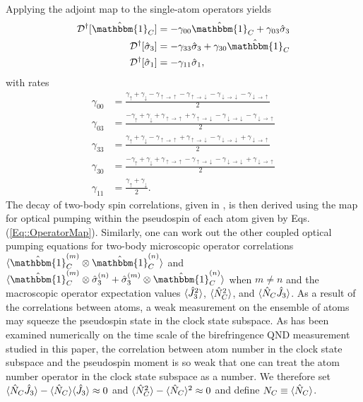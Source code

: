 \documentclass[aps,pra,twocolumn]{revtex4-1} %
\newcommand{\gammauu}{\gamma_{\uparrow \rightarrow \uparrow}}
\newcommand{\gammadd}{\gamma_{\downarrow \rightarrow \downarrow}}
\newcommand{\gammaud}{\gamma_{\uparrow \rightarrow \downarrow}}
\newcommand{\gammadu}{\gamma_{\downarrow \rightarrow \uparrow}}
\newcommand{\comment}[1]{{\color{Maroon} #1}}
\begin{document}
\begin{appendix}
Applying the adjoint map to the single-atom operators yields 
	\begin{subequations} \label{Eq::OperatorMap}
	\begin{align}
		\mathcal{D}\dg[\hat{\mathbbm{1}}_C] & = - \gamma_{00} \hat{\mathbbm{1}}_C +\gamma_{03} \hat{\sigma}_3 \label {Eq::Idecay} \\
		\mathcal{D}\dg[\hat{\sigma}_3] & =- \gamma_{33} \hat{\sigma}_3 +  \gamma_{30} \hat{\mathbbm{1}}_C 
\label{Eq::zdecay} \\
		\mathcal{D}\dg[\hat{\sigma}_1] & = - \gamma_{11} \hat{\sigma}_1\label{Eq::xdecay},
	\end{align}
	\end{subequations}
with rates	
	\begin{subequations} \label{Eq::DecayRates}
	\begin{align}
		\gamma_{00} 
			& = \frac{\gamma_{\uparrow}+\gamma_{\downarrow} - \gammauu-\gammaud  -\gammadd-\gammadu}{2} \label{Eq::lrate} \\
			\gamma_{03} 
			& = \frac{-\gamma_{\uparrow}+\gamma_{\downarrow} +\gammauu + \gammaud - \gammadd - \gammadu }{2}\\		
		\gamma_{33} 
			& = \frac{\gamma_{\uparrow}+\gamma_{\downarrow} - \gammauu+\gammaud  -\gammadd+\gammadu}{2}\\
			\gamma_{30} 
			& = \frac{-\gamma_{\uparrow} + \gamma_{\downarrow} + \gammauu - \gammaud - \gammadd + \gammadu }{2} \\
			\gamma_{11} 
			& = \frac{\gamma_{\uparrow}+\gamma_{\downarrow}}{2}. \label{Eq::frate}
	\end{align}
	\end{subequations}
The decay of two-body spin correlations, given in , is then derived using the map for optical pumping within the pseudospin of each atom given by Eqs. (\ref{Eq::OperatorMap}).  
Similarly, one can work out the other coupled optical pumping equations for two-body microscopic operator correlations $ \expt{\hat{\mathbbm{1}}^{(m)}_C \otimes \hat{\mathbbm{1}}^{(n)}_C} $ and $ \expt{\hat{\mathbbm{1}}^{(m)}_C \otimes \hat{\sigma}_3^{(n)} + \hat{\sigma}_3^{(m)} \otimes \hat{\mathbbm{1}}^{(n)}_C } $ when $ m\neq n $ and the macroscopic operator expectation values $ \langle{\hat{J}_3^2}\rangle $, $ \langle{\hat{N}_C^2}\rangle $, and $ \langle{\hat{N}_C\hat{J}_3}\rangle $. 
As a result of the correlations between atoms, a weak measurement on the ensemble of atoms may squeeze the pseudospin state in the clock state subspace. 
As has been examined numerically on the time scale of the birefringence QND measurement studied in this paper, the correlation between atom number in the clock state subspace and the pseudospin moment is so weak that one can treat the atom number operator in the clock state subspace as a number.
We therefore set \comment{$ \langle{\hat{N}_C\hat{J}_3}\rangle-\langle{\hat{N}_C}\rangle\langle{\hat{J}_3}\rangle\approx 0 $} and $ \langle{\hat{N}_C^2}\rangle - \langle{\hat{N}_C}\rangle^2 \approx 0 $ and define $ N_C\equiv \langle{\hat{N}_C}\rangle$. 


\end{appendix}
\end{document}
